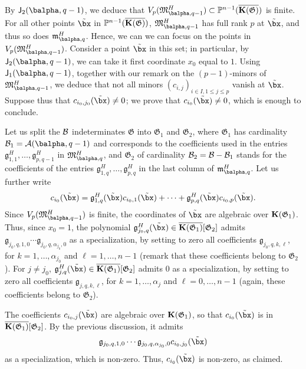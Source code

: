 \documentclass[12pt]{article}
\begin{document}
By $\assI_2(\balpha,q-1)$, we deduce that
$V_p(\mathfrak{M}^H_{\balpha,q-1}) \subset \P^{n-1}(\KKCbar)$ is
finite. For all other points $\tilde\bx$ in $\mathbb{P}^{n-1}(\overline{\mathbf{K}(\mathfrak{G})})$,
$\mathfrak{M}^H_{\balpha,q-1}$ has full rank $p$ at $\tilde\bx$, and
thus so does $\mathfrak{m}^H_{\balpha,q}$. Hence, we can we can focus
on the points in $V_p(\mathfrak{M}^H_{\balpha,q-1})$.  Consider a point
$\tilde\bx$ in this set; in particular, by $\assI_2(\balpha,q-1)$, we
can take it first coordinate $x_0$ equal to $1$. Using
$\assI_1(\balpha,q-1)$, together with our remark on the $(p-1)$-minors of
$\mathfrak{M}^H_{\balpha,q-1}$, we deduce that not all minors
$(c_{i,j})_{i \in I, 1 \le j \le p}$ vanish at
$\tilde\bx$. Suppose thus that $c_{i_0,j_0}(\tilde\bx) \ne 0$; we
prove that $c_{i_0}(\tilde\bx) \ne 0$, which is enough to conclude.

Let us split the ${\cal B}$ indeterminates $\mathfrak{G}$ into
$\mathfrak{G}_1$ and $\mathfrak{G}_2$, where $\mathfrak{G}_1$ has
cardinality ${\cal B}_1={\cal A}(\balpha,q-1)$ and corresponds to the coefficients
used in the entries
$\mathfrak{g}^H_{1,1},\dots,\mathfrak{g}^H_{p,q-1}$ in
$\mathfrak{M}^H_{\balpha,q}$, and $\mathfrak{G}_2$ of cardinality
${\cal B}_2={\cal B}-{\cal B}_1$ stands for the coefficients of the entries
$\mathfrak{g}^H_{1,q},\dots,\mathfrak{g}^H_{p,q}$ in the last column
of $\mathfrak{m}^H_{\balpha,q}$.  Let us further
write $$c_{i_0}(\tilde\bx)= \mathfrak{g}^H_{1,q}(\tilde\bx)
c_{i_0,1}(\tilde\bx) + \cdots + \mathfrak{g}^H_{p,q}(\tilde\bx)
c_{i_0,p}(\tilde\bx).$$ Since $V_p(\mathfrak{M}^H_{\balpha,q-1})$ is
finite, the coordinates of $\tilde\bx$ are algebraic over
$\mathbf{K}(\mathfrak{G}_1)$.  Thus, since $x_0=1$, the polynomial
$\mathfrak{g}^H_{j_0,q}(\tilde\bx)\in
\overline{\KK(\mathfrak{G}_1)}[\mathfrak{G}_2]$ admits
$\mathfrak{g}_{j_0,q,1,0}\cdots \mathfrak{g}_{j_0,q,\alpha_{j_0},0}$ as a
specialization, by setting to zero all coefficients
$\mathfrak{g}_{j_0,q,k,\ell}$, for $k=1,\dots,\alpha_{j_0}$ and
$\ell=1,\dots,n-1$ (remark that these coefficients belong to $\mathfrak{G}_2$).  For $j \ne
j_0$, $\mathfrak{g}^H_{j,q}(\tilde\bx)\in
\overline{\KK(\mathfrak{G}_1)}[\mathfrak{G}_2]$ admits $0$ as a
specialization, by setting to zero all coefficients
$\mathfrak{g}_{j,q,k,\ell}$, for $k=1,\dots,\alpha_j$ and
$\ell=0,\dots,n-1$ (again, these coefficients belong to $\mathfrak{G}_2$).

The coefficients $c_{i_0,j}(\tilde\bx)$ are algebraic over
$\mathbf{K}(\mathfrak{G}_1)$, so that $c_{i_0}(\tilde\bx)$ is in
$\overline{\mathbf{K}(\mathfrak{G}_1)}[\mathfrak{G}_2]$. By the previous 
discussion, it admits
$$ \mathfrak{g}_{j_0,q,1,0}\cdots \mathfrak{g}_{j_0,q,\alpha_{j_0},0} c_{i_0,j_0}(\tilde\bx)$$ as a
specialization, which is non-zero. Thus,  $c_{i_0}(\tilde\bx)$ 
is non-zero, as claimed.
\end{document}
